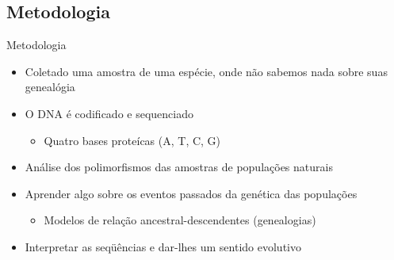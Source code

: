 \documentclass{beamer}
\begin{document}
\subsection{Metodologia}
    \begin{frame}{Metodologia}
        \begin{itemize}
            \item Coletado uma amostra de uma espécie, onde não sabemos nada sobre suas genealógia
            \item O DNA é codificado e sequenciado
                \begin{itemize}
                    \item Quatro bases proteícas (A, T, C, G)
                \end{itemize}   
            \item Análise dos polimorfismos das amostras de populações naturais
            \item Aprender algo sobre os eventos passados da genética das populações
            \begin{itemize}
                \item Modelos de relação ancestral-descendentes (genealogias)
            \end{itemize} 
            \item Interpretar as seqüências e dar-lhes um sentido evolutivo
        \end{itemize} 
 
     \end{frame}
\end{document}
